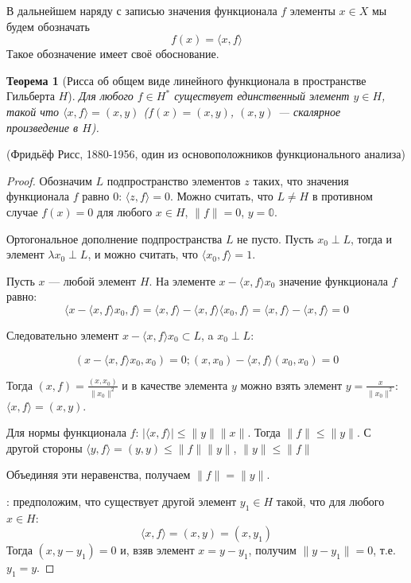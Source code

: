 \documentclass[12pt,a4paper,titlepage,oneside]{book}
\theoremstyle{definition}
\theoremstyle{plain}
\newtheorem*{theorem}{Теорема}
\theoremstyle{break}
\theoremstyle{remark}
\theoremstyle{remark}
\theoremstyle{remark}
\theoremstyle{remark}
\theoremstyle{plain}
\theoremstyle{plain}
\begin{document}
В дальнейшем наряду с записью значения функционала $f$ элементы $x \in X$ мы будем обозначать
\begin{equation*}
f(x) =  \langle x, f \rangle 
\end{equation*}
Такое обозначение имеет своё обоснование.
\begin{theorem}[Рисса об общем виде линейного функционала в пространстве Гильберта $H$]
Для любого $f \in H^*$ существует единственный элемент $y \in H$, такой что $ \langle x, f \rangle =(x,y)$ ($f(x)=(x,y)$, $(x,y)$ --- скалярное произведение в $H$).
\end{theorem}

(Фридьёф Рисс, 1880-1956, один из основоположников функционального анализа)

\begin{proof}
Обозначим $L$ подпространство элементов $z$ таких, что значения функционала $f$ равно 0: $ \langle z, f \rangle =0$. Можно считать, что $L\ne H$ в противном случае $f(x)=0$ для любого $x\in H$, $\lVert f\rVert = 0$, $y=\mathbb{0}$.

Ортогональное дополнение подпространства $L$ не пусто. Пусть $x_0\perp L$, тогда и элемент $\lambda x_0\perp L$, и можно считать, что $ \langle x_0, f \rangle =1$.

Пусть $x$ --- любой элемент $H$. На элементе $x- \langle x, f \rangle x_0$ значение функционала $f$ равно:
\begin{equation*}
 \langle x- \langle x, f \rangle x_0, f \rangle  =  \langle x, f \rangle - \langle x, f \rangle  \langle x_0, f \rangle  =  \langle x, f \rangle - \langle x, f \rangle  = 0
\end{equation*}

Следовательно элемент $x- \langle x, f \rangle x_0 \subset L$, a $x_0\perp L$:

\begin{equation*}
(x- \langle x, f \rangle x_0, x_0) = 0; (x, x_0) -  \langle x, f \rangle (x_0, x_0) = 0
\end{equation*}

Тогда $(x, f) = \frac{(x, x_0)}{\lVert x_0\rVert^2}$ и в качестве элемента $y$ можно взять элемент $y=\frac{x}{\lVert x_0\rVert^2}$:$ \langle x, f \rangle  = (x, y)$.

Для нормы функционала $f$: $\lvert  \langle x, f \rangle \rvert \leqslant \lVert y\rVert\lVert x\rVert$. Тогда $\lVert f\rVert \leqslant \lVert y\rVert$. С другой стороны $ \langle y, f \rangle  = (y, y) \leqslant \lVert f\rVert\lVert y\rVert$, $\lVert y\rVert\le\lVert f\rVert$

Объединяя эти неравенства, получаем $\lVert f\rVert = \lVert y\rVert$.

: предположим, что существует другой элемент $y_1 \in H$ такой, что для любого $x\in H$:
\begin{equation*}
 \langle x, f \rangle  = (x, y) = (x, y_1)
\end{equation*}
Тогда $(x, y-y_1) = 0$ и, взяв элемент $x = y-y_1$, получим $\lVert y-y_1\rVert = 0$, т.е. $y_1 = y$.
\end{proof}
\end{document}
